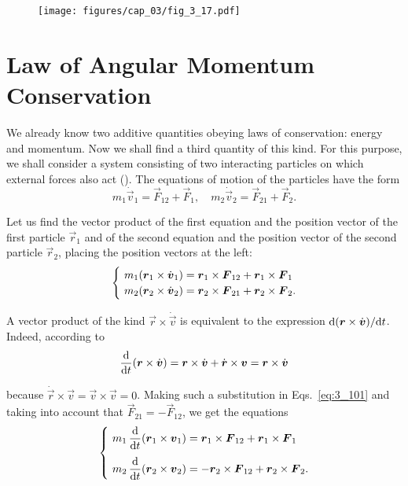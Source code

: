 \begin{figure}[t]
	\begin{center}
		\texttt{[image: figures/cap\_03/fig\_3\_17.pdf]}
		\caption[]{}
		\label{fig:3_17}
	\end{center}
	\vspace{-0.7cm}
\end{figure}

\section{Law of Angular Momentum Conservation}\label{sec:3_12}

We already know two additive quantities obeying laws of conservation: energy and momentum. Now we shall find a third quantity of this kind. For this purpose, we shall consider a system consisting of two interacting particles on which external forces also act (). The equations of motion of the particles have the form
\begin{equation*}
m_1\dot{\vec{v}}_1 = \vec{F}_{12} + \vec{F}_1,\quad m_2\dot{\vec{v}}_2 = \vec{F}_{21} + \vec{F}_2.
\end{equation*}

\noindent
Let us find the vector product of the first equation and the position vector of the first particle $\vec{r}_1$ and of the second equation and the position vector of the second particle $\vec{r}_2$, placing the position vectors at the left:
\begin{equation}\label{eq:3_101}
\begin{cases}
& \!\!\!\! m_1(\vec{r}_1\times\dot{\vec{v}}_1) = \vecprodind{r}{1}{F}{12} + \vecprodind{r}{1}{F}{1}\\
& \!\!\!\! m_2(\vec{r}_2\times\dot{\vec{v}}_2) = \vecprodind{r}{2}{F}{21} + \vecprodind{r}{2}{F}{2}.
\end{cases}
\end{equation}

A vector product of the kind $\vec{r}\times\dot{\vec{v}}$ is equivalent to the expression $\mathrm{d}(\boldsymbol{r}\times\dot{\boldsymbol{v}})/\mathrm{d} t$. Indeed, according to 
\begin{equation}\label{eq:3_102}
\frac{\mathrm{d}}{\mathrm{d} t}(\boldsymbol{r}\times\dot{\boldsymbol{v}}) = \boldsymbol{r}\times\dot{\boldsymbol{v}} + \dot{\boldsymbol{r}}\times\boldsymbol{v} = \boldsymbol{r}\times\dot{\boldsymbol{v}}
\end{equation}

\noindent
because $\dot{\vec{r}}\times\vec{v}=\vec{v}\times\vec{v}=0$. Making such a substitution in Eqs.~\eqref{eq:3_101} and taking into account that $\vec{F}_{21}=-\vec{F}_{12}$, we get the equations
\begin{equation}\label{eq:3_103}
\begin{cases}
& \!\!\!\! m_1\,\dfrac{\upd}{\deriv{t}}(\vec{r}_1\times\vec{v}_1) = \vecprodind{r}{1}{F}{12} + \vecprodind{r}{1}{F}{1}\\[10pt]
& \!\!\!\! m_2\,\dfrac{\upd}{\deriv{t}}(\vec{r}_2\times\vec{v}_2) = - \vecprodind{r}{2}{F}{12} + \vecprodind{r}{2}{F}{2}.
\end{cases}
\end{equation}

